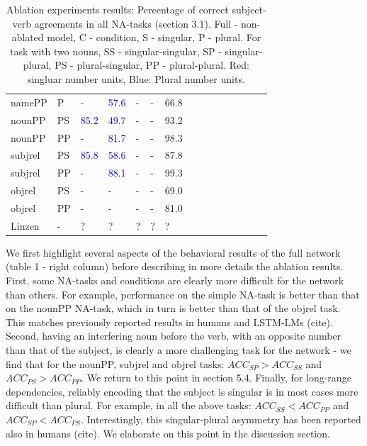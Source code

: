 \begin{center}
\begin{table}[ht]
\begin{tabular}{|P{1.4cm}|P{0.4cm}||P{0.6cm}|P{0.6cm}|P{0.6cm}|P{0.6cm}|P{0.6cm}|P{0.6cm}|P{0.6cm}|P{0.6cm}|P{0.6cm}|P{0.6cm}|P{0.6cm}|P{0.6cm}||P{0.6cm}|}
\B namePP & \B P & - &  \textcolor{blue}{57.6} &  - &  - &  66.8 \\

\B nounPP & \B PS &  \textcolor{blue}{85.2} &  \textcolor{blue}{49.7} & - &  - &  93.2 \\

\B nounPP & \B PP &  - &  \textcolor{blue}{81.7} &  - &  - &  98.3 \\

\B subjrel & \B PS &  \textcolor{blue}{85.8}  &  \textcolor{blue}{58.6}  &  - &  - &  87.8 \\

\B subjrel & \B PP &  - &  \textcolor{blue}{88.1} &  - &  - &  99.3 \\

\B objrel & \B PS & - &  - &  - &  - &  69.0 \\

\B objrel & \B PP &  - &  - &  - &  - &  81.0 \\
\hline
\hline
\B Linzen & \B - &  ? &  ? &  ? &  ? &  ? \\
\hline
\end{tabular}
\caption{Ablation experiments results: Percentage of correct subject-verb agreements in all NA-tasks (section 3.1). Full - non-ablated model, C - condition, S - singular, P - plural. For task with two nouns, SS - singular-singular, SP - singular-plural, PS - plural-singular, PP - plural-plural. Red: singluar number units, Blue: Plural number units.}
\end{table}
\end{center}

We first highlight several aspects of the behavioral results of the full network (table 1 - right column) before describing in more details the ablation results. 
First, some NA-tasks and conditions are clearly more difficult for the network than others. 
For example, performance on the simple NA-task is better than that on the nounPP NA-task, which in turn is better than that of the objrel task. 
This matches previously reported results in humans and LSTM-LMs (cite). 
Second, having an interfering noun before the verb, with an opposite number than that of the subject, is clearly a more challenging task for the network - we find that for the nounPP, subjrel and objrel tasks: $ACC_{SP}>ACC_{SS}$ and $ACC_{PS}>ACC_{PP}$. 
We return to this point in section 5.4. 
Finally, for long-range dependencies, reliably encoding that the subject is singular is in most cases more difficult than plural. 
For example, in all the above tasks: $ACC_{SS}<ACC_{PP}$ and $ACC_{SP}<ACC_{PS}$. 
Interestingly, this singular-plural asymmetry has been reported also in humans (cite). 
We elaborate on this point in the discussion section.

